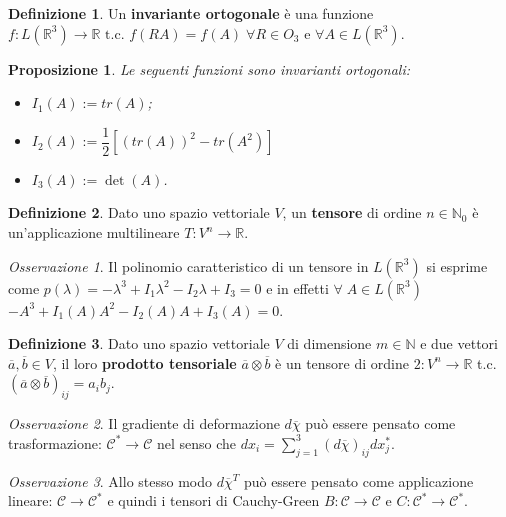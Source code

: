 \documentclass{book}
\theoremstyle{plain}
\theoremstyle{plain}
\theoremstyle{plain}
\theoremstyle{plain}
\theoremstyle{plain}
\newtheorem*{prop*}{Proposizione}
\theoremstyle{definition}
\newtheorem*{defi*}{Definizione}
\theoremstyle{remark}
\newtheorem*{oss}{Osservazione}
\theoremstyle{definition}
\begin{document}
\begin{defi*}
    Un \textbf{invariante ortogonale} è una funzione $f:L(\mathbb{R}^3)\to\mathbb{R} \text{ t.c. } f(RA)=f(A) \;\forall R\in O_3 \text{ e } \forall A \in L(\mathbb{R}^3)$.
\end{defi*}

\begin{prop*}
    Le seguenti funzioni sono invarianti ortogonali:
    \begin{itemize}
        \item $I_1(A):=tr(A)$;
        \item $I_2(A):=\dfrac{1}{2}[(tr(A))^2-tr(A^2)]$
        \item $I_3(A):=\det(A)$.
    \end{itemize}
\end{prop*}

\begin{defi*}
    Dato uno spazio vettoriale $V$, un \textbf{tensore} di ordine $n\in\mathbb{N}_0$ è un'applicazione multilineare $T: V^n\to\mathbb{R}$.
\end{defi*}

\begin{oss}
    Il polinomio caratteristico di un tensore in $L(\mathbb{R}^3)$ si esprime come $p(\lambda)=-\lambda^3+I_1\lambda^2-I_2\lambda+I_3=0$ e in effetti $\forall \;A\in L(\mathbb{R}^3)$ $-A^3+I_1(A)A^2-I_2(A)A+I_3(A)=0$.
\end{oss}

\begin{defi*}
    Dato uno spazio vettoriale $V$ di dimensione $m\in\mathbb{N}$ e due vettori $\overline{a}, \overline{b}\in V$, il loro \textbf{prodotto tensoriale} $\overline{a}\otimes\overline{b}$ è un tensore di ordine $2: V^n \to \mathbb{R}$ t.c. $\left(\overline{a}\otimes\overline{b}\right)_{ij}=a_ib_j$.
\end{defi*}

\begin{oss}
    Il gradiente di deformazione $d\overline{\chi}$ può essere pensato come trasformazione: $\mathcal{C}^*\to\mathcal{C}$ nel senso che $dx_i=\sum_{j=1}^3(d\overline{\chi})_{ij} dx^*_j$.
\end{oss}

\begin{oss}
    Allo stesso modo $d\overline{\chi}^T$ può essere pensato come applicazione lineare: $\mathcal{C}\to\mathcal{C}^*$ e quindi i tensori di Cauchy-Green $B: \mathcal{C}\to\mathcal{C} \text{ e } C: \mathcal{C}^*\to\mathcal{C}^*$.
\end{oss}
\end{document}
